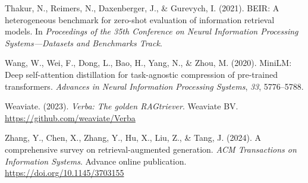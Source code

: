 {Thakur, N., Reimers, N., Daxenberger, J., \& Gurevych, I. (2021). BEIR: A heterogeneous benchmark for zero-shot evaluation of information retrieval models. In \textit{Proceedings of the 35th Conference on Neural Information Processing Systems---Datasets and Benchmarks Track}.

Wang, W., Wei, F., Dong, L., Bao, H., Yang, N., \& Zhou, M. (2020). MiniLM: Deep self-attention distillation for task-agnostic compression of pre-trained transformers. \textit{Advances in Neural Information Processing Systems}, \textit{33}, 5776--5788.

Weaviate. (2023). \textit{Verba: The golden RAGtriever}. Weaviate BV. \url{https://github.com/weaviate/Verba}

Zhang, Y., Chen, X., Zhang, Y., Hu, X., Liu, Z., \& Tang, J. (2024). A comprehensive survey on retrieval-augmented generation. \textit{ACM Transactions on Information Systems}. Advance online publication. \url{https://doi.org/10.1145/3703155}


}
